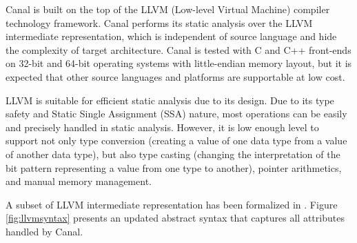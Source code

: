 \documentclass[a4paper]{book}
\begin{document}
Canal is built on the top of the LLVM \cite{LA04} (Low-level Virtual
Machine) compiler technology framework.  Canal performs its static
analysis over the LLVM intermediate representation, which is
independent of source language and hide the complexity of target
architecture.  Canal is tested with C and C++ front-ends on 32-bit and
64-bit operating systems with little-endian memory layout, but it is
expected that other source languages and platforms are supportable at
low cost.

LLVM is suitable for efficient static analysis due to its design.  Due
to its type safety and Static Single Assignment (SSA) nature, most
operations can be easily and precisely handled in static analysis.
However, it is low enough level to support not only type conversion
(creating a value of one data type from a value of another data type),
but also type casting (changing the interpretation of the bit pattern
representing a value from one type to another), pointer arithmetics,
and manual memory management.

A subset of LLVM intermediate representation has been formalized in
\cite{ZNMZ12}.  Figure \ref{fig:llvmsyntax} presents an updated
abstract syntax that captures all attributes handled by Canal.
\end{document}
